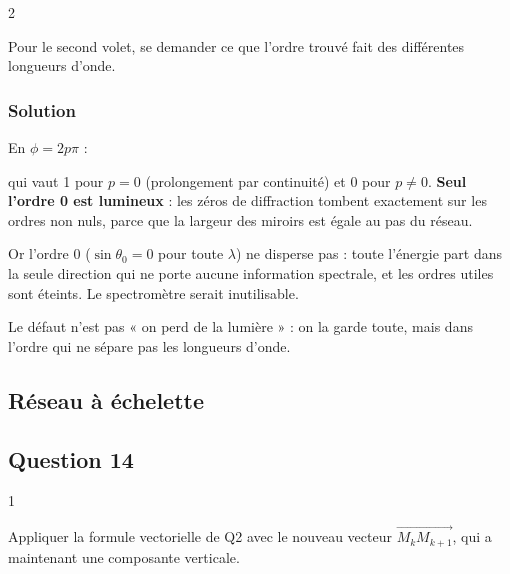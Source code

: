 \documentclass[11pt,a4paper]{article}
\newcommand{\equationajustee}[1]{%
  \sbox{\boiteequation}{$\displaystyle #1$}%
  \ifdim\wd\boiteequation>\linewidth
    \[\resizebox{\linewidth}{!}{\usebox{\boiteequation}}\]%
  \else
    \[#1\]%
  \fi}
\begin{document}
\begin{indication}{2}

Pour le second volet, se demander ce que l'ordre trouvé fait des différentes longueurs d'onde.

\end{indication}

\hypertarget{solution-12}{%
\subsubsection{Solution}\label{solution-12}}

En \(\phi = 2p\pi\) :

\equationajustee{I_{n,\text{tot}} = \left(\frac{\sin p\pi}{p\pi}\right)^2,}

qui vaut 1 pour \(p = 0\) (prolongement par continuité) et 0 pour \(p\neq0\). \textbf{Seul l'ordre 0 est lumineux} : les zéros de diffraction tombent exactement sur les ordres non nuls, parce que la largeur des miroirs est égale au pas du réseau.

Or l'ordre 0 (\(\sin\theta_0 = 0\) pour toute \(\lambda\)) ne disperse pas : toute l'énergie part dans la seule direction qui ne porte aucune information spectrale, et les ordres utiles sont éteints. Le spectromètre serait inutilisable.

\begin{piege}

Le défaut n'est pas « on perd de la lumière » : on la garde toute, mais dans l'ordre qui ne sépare pas les longueurs d'onde.

\end{piege}

\hypertarget{ruxe9seau-uxe0-uxe9chelette}{%
\subsection{Réseau à échelette}\label{ruxe9seau-uxe0-uxe9chelette}}

\hypertarget{question-14}{%
\subsection{Question 14}\label{question-14}}

\begin{indication}{1}

Appliquer la formule vectorielle de Q2 avec le nouveau vecteur \(\overrightarrow{M_kM_{k+1}}\), qui a maintenant une composante verticale.

\end{indication}
\end{document}
